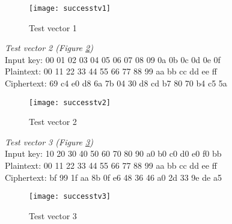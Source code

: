 \begin{figure}
  \texttt{[image: successtv1]}
  \caption{Test vector 1}
  \label{test:1}
\end{figure}

\emph{Test vector 2 (Figure \ref{test:2})}\\
Input key: 00 01 02 03 04 05 06 07 08 09 0a 0b 0c 0d 0e 0f\\
Plaintext: 00 11 22 33 44 55 66 77 88 99 aa bb cc dd ee ff\\
Ciphertext: 69 c4 e0 d8 6a 7b 04 30 d8 cd b7 80 70 b4 c5 5a

\begin{figure}
  \texttt{[image: successtv2]}
  \caption{Test vector 2}
  \label{test:2}
\end{figure}

\emph{Test vector 3 (Figure \ref{test:3})} \\
Input key: 10 20 30 40 50 60 70 80 90 a0 b0 c0 d0 e0 f0 bb\\
Plaintext: 00 11 22 33 44 55 66 77 88 99 aa bb cc dd ee ff\\
Ciphertext: bf 99 1f aa 8b 0f e6 48 36 46 a0 2d 33 9e de a5

\begin{figure}
  \texttt{[image: successtv3]}
  \caption{Test vector 3}
  \label{test:3}
\end{figure}
